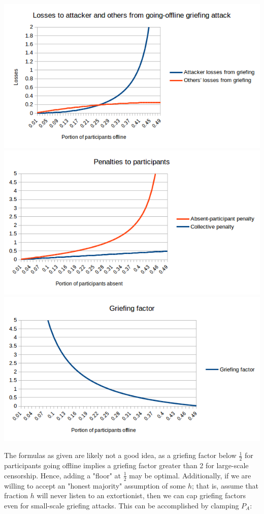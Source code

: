\documentclass[12pt]{article}
\begin{document}
\includegraphics{chart1.png}
\includegraphics{chart2.png}
\includegraphics{chart3.png}

The formulas as given are likely not a good idea, as a griefing factor below $\frac{1}{2}$ for participants going offline implies a griefing factor greater than 2 for large-scale censorship. Hence, adding a "floor" at $\frac{1}{2}$ may be optimal. Additionally, if we are willing to accept an "honest majority" assumption of some $h$; that is, assume that fraction $h$ will never listen to an extortionist, then we can cap griefing factors even for small-scale griefing attacks. This can be accomplished by clamping $P_A$:
\end{document}
